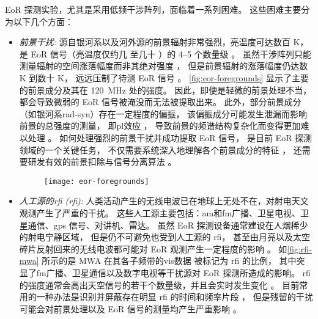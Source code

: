 EoR 探测实验，尤其是采用低频干涉阵列，面临着一系列困难。
这些困难主要分为以下几个方面：
\begin{itemize}
\item
\emph{前景干扰:}
源自银河系以及河外源的前景辐射非常强烈，亮温度可达数百 \si{\kelvin}，
是 EoR 信号（亮温度仅约几 \si{\mK} 至几十 \si{\mK}）的 \numrange{4}{5} 个数量级
\cite{morales2010}。
虽然干涉阵列只能测量辐射的空间涨落幅度而非其绝对强度 \cite{braun1985}，
但是前景辐射的涨落幅度仍达数 \si{\kelvin} 到数十 \si{\kelvin}，
远远压制了待测 EoR 信号 \cite{zaroubi2013}。
\autoref{fig:eor-foregrounds} 显示了主要的前景成分及其在 \SI{120}{\MHz} 处的强度。
因此，即便是轻微的前景处理不当，都会导致微弱的 EoR 信号被淹没而无法被提取出来。
此外，部分前景成分（如银河系\ac{rad-syn}）存在一定程度的偏振，
该偏振成分可能发生泄漏而影响前景的总强度的测量，
即\ac{pl}效应 \cite{cotton1999,reid2008}，
导致前景的频谱结构复杂化而变得更加难以处理
\cite{jelic2014,asad2015,asad2016,asad2018,gehlot2018}。
如何处理强烈的前景干扰并成功提取 EoR 信号，
是目前 EoR 探测领域的一个关键任务，
不仅需要系统深入地理解各个前景成分的特征
\cite{jelic2008,jelic2010,wang2010,liu2012,offringa2016,
  carroll2016,murray2017,procopio2017,spinelli2018}，
还需要研发有效的前景扣除与信号分离算法
\cite{wang2006,jelic2008,harker2009,liu2009fgrm,chapman2012,chapman2013,
  gu2013,wang2013,bonaldi2015,chapman2015,chapman2016,mertens2018}。

\begin{figure}[htp]
  \centering
  \texttt{[image: eor-foregrounds]}
  \label{fig:eor-foregrounds}
\end{figure}

\item
\emph{人工源的\acl{rfi} (\ac{rfi}):}
人类活动产生的无线电波已在地球上无处不在，对射电天文观测产生了严重的干扰。
这些人工源主要包括：\ac{am}和\ac{fm}广播、卫星电视、卫星通信、\ac{gps} 信号、对讲机、雷达。
虽然 EoR 探测设备通常建设在人烟稀少的射电宁静区域，
但是仍不可避免也受到人工源的 \ac{rfi}，
甚至由月亮以及太空碎片反射回来的无线电波都可能对 EoR 观测产生一定程度的影响
\cite{mcKinley2013,tingay2013rfi}。
如\autoref{fig:rfi-mwa} 所示的是 MWA 在其各子频带的\ac{vis}数据
被标记为 \ac{rfi} 的比例，
其中突显了\ac{fm}广播、卫星通信以及数字电视等干扰源对 EoR 探测所造成的影响。
\ac{rfi} 的强度通常会高出天空信号的若干个数量级，并且会实时发生变化 \cite{bentum2011}。
目前常用的一种办法是识别并屏蔽存在明显 \ac{rfi} 的时间和频率片段
\cite{fridman2001,offringa2010,offringa2012,prasad2012,akeret2017}，
但是残留的干扰可能会对前景处理以及 EoR 信号的测量均产生严重影响 \cite{offringa2015}。


\end{itemize}
